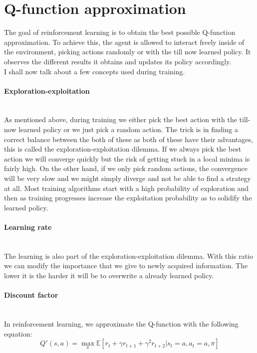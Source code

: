  \section{Q-function approximation} 
The goal of reinforcement learning is to obtain the best possible Q-function approximation. To achieve this, the agent is allowed to interact freely inside of the environment, picking actions randomly or with the till now learned policy. It observes the different results it obtains and updates its policy accordingly.\\ I shall now talk about a few concepts used during training.
\paragraph{Exploration-exploitation} \mbox{}\\
As mentioned above, during training we either pick the best action with the till-now learned policy or we just pick a random action. The trick is in finding a correct balance between the both of these as both of these have their advantages, this is called the exploration-exploitation dilemma\cite{yogeswaran2012reinforcement}. If we always pick the best action we will converge quickly but the risk of getting stuck in a local minima is fairly high. On the other hand, if we only pick random actions, the convergence will be very slow and we might simply diverge and not be able to find a strategy at all. Most training algorithms start with a high probability of exploration and then as training progresses increase the exploitation probability as to solidify the learned policy.
\paragraph{Learning rate}\mbox{}\\
The learning is also part of the exploration-exploitation dilemma. With this ratio we can modify the importance that we give to newly acquired information. The lower it is the harder it will be to overwrite a already learned policy.

\paragraph{Discount factor}\mbox{}\\
In reinforcement learning, we approximate the Q-function with the following equation:
\begin{equation}
	Q'(s,a) = \max_{\pi} \mathbb{E}[r_t+\gamma r_{t+1}+\gamma^2 r_{t+2}| s_t=a, a_t = a,\pi]
\end{equation}

